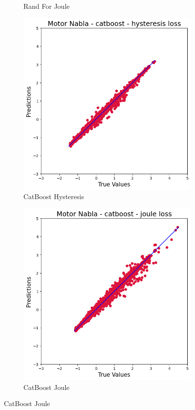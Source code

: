 \documentclass{article}
\begin{document}
\begin{figure}[!htbp]
\begin{subfigure}[b]{0.23\textwidth}
        \caption{Rand For Joule}
    \end{subfigure}
    \hfill
    \begin{subfigure}[b]{0.23\textwidth}
        \centering
        \includegraphics[width=\textwidth]{images/Nabla/catboost_hysteresis.png}
        \caption{CatBoost Hysteresis}
    \end{subfigure}
    \hfill
    \begin{subfigure}[b]{0.23\textwidth}
        \centering
        \includegraphics[width=\textwidth]{images/Nabla/catboost_joule.png}
        \caption{CatBoost Joule}
    \end{subfigure}
    

\end{figure}
\end{document}
